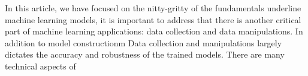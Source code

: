 In this article, we have focused on the nitty-gritty of the fundamentals underline machine learning models, it is important to address that there is another critical part of machine learning applications: data collection and data manipulations. In addition to model constructionm Data collection and manipulations largely dictates the accuracy and robustness of the trained models. There are many technical aspects of 